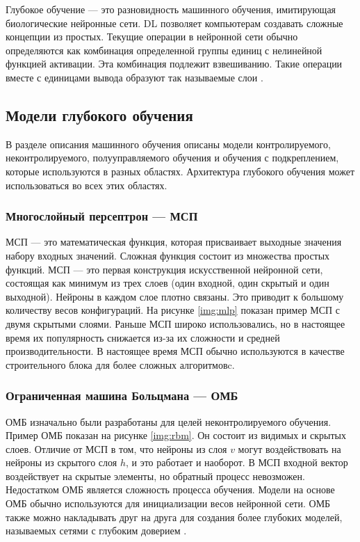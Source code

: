 Глубокое обучение — это разновидность машинного обучения, имитирующая биологические нейронные сети. DL позволяет компьютерам создавать сложные концепции из простых. Текущие операции в нейронной сети обычно определяются как комбинация определенной группы единиц с нелинейной функцией активации. Эта комбинация подлежит взвешиванию. Такие операции вместе с единицами вывода образуют так называемые слои \cite{deeplearninmob}.

\subsection{Модели глубокого обучения}

В разделе описания машинного обучения описаны модели контролируемого, неконтролируемого, полууправляемого обучения и обучения с подкреплением, которые используются в разных областях. Архитектура глубокого обучения может использоваться во всех этих областях.

\subsubsection{Многослойный персептрон --- МСП}

МСП --- это математическая функция, которая присваивает выходные значения набору входных значений. Сложная функция состоит из множества простых функций. МСП — это первая конструкция искусственной нейронной сети, состоящая как минимум из трех слоев (один входной, один скрытый и один выходной). Нейроны в каждом слое плотно связаны. Это приводит к большому количеству весов конфигураций. На рисунке \ref{img:mlp} показан пример МСП с двумя скрытыми слоями. Раньше МСП широко использовались, но в настоящее время их популярность снижается из-за их сложности и средней производительности. В настоящее время МСП обычно используются в качестве строительного блока для более сложных алгоритмовc.


\FloatBarrier

\subsubsection{Ограниченная машина Больцмана --- ОМБ}

ОМБ изначально были разработаны для целей неконтролируемого обучения. Пример ОМБ показан на рисунке \ref{img:rbm}. Он состоит из видимых и скрытых слоев. Отличие от МСП в том, что нейроны из слоя $v$ могут воздействовать на нейроны из скрытого слоя $h$, и это работает и наоборот. В МСП входной вектор воздействует на скрытые элементы, но обратный процесс невозможен. Недостатком ОМБ является сложность процесса обучения. Модели на основе ОМБ обычно используются для инициализации весов нейронной сети. ОМБ также можно накладывать друг на друга для создания более глубоких моделей, называемых сетями с глубоким доверием \cite{beginguidetorbm}.

